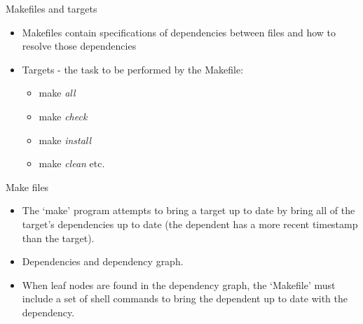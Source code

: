 \documentclass{beamer}
\begin{document}
\begin{frame}{Makefiles and targets}
\begin{itemize}
	\item Makefiles contain specifications of dependencies between files and how to resolve those dependencies
	\item Targets - the task to be performed by the Makefile:
	\begin{itemize}
		\item make \emph{all}
		\item make \emph{check}
		\item make \emph{install}
		\item make \emph{clean} etc.
	\end{itemize}
\end{itemize}
\end{frame}

\begin{frame}{Make files}
\begin{itemize}
	\item The `make' program attempts to bring a target up to date by bring all of the target's dependencies up to date (the dependent has a more recent timestamp than the target).
	\item Dependencies and dependency graph.	
	\begin{figure}
	\end{figure}
	\item When leaf nodes are found in the dependency graph, the `Makefile' must include a set of shell commands to bring the dependent up to date with the dependency.
\end{itemize}
\end{frame}
\end{document}
